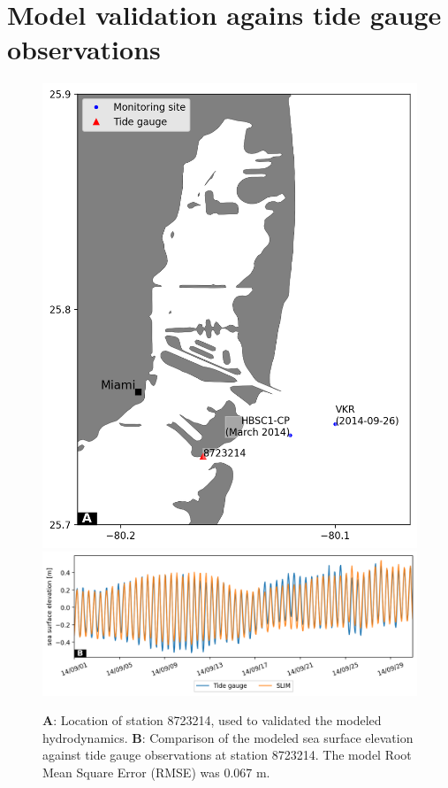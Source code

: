 \documentclass[preprint,12pt,authoryear]{elsarticle}
\begin{document}
\section{Model validation agains tide gauge observations}\label{onset:validation}
\begin{figure}[h!]
    \centering
	\includegraphics[width=.5\textwidth]{figures/fig_tide_gauge.png}
	\includegraphics[width=\textwidth]{figures/validation_VK_september.png}
	\caption{\textbf{A}: Location of station 8723214, used to validated the modeled hydrodynamics. \textbf{B}: Comparison of the modeled sea surface elevation against tide gauge observations at station 8723214. The model Root Mean Square Error (RMSE) was 0.067 m.}
\end{figure}
\end{document}
